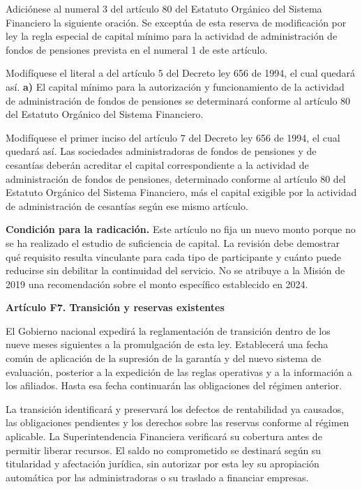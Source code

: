 Adiciónese al numeral 3 del artículo 80 del Estatuto Orgánico del Sistema Financiero la siguiente oración. Se exceptúa de esta reserva de modificación por ley la regla especial de capital mínimo para la actividad de administración de fondos de pensiones prevista en el numeral 1 de este artículo.

Modifíquese el literal a del artículo 5 del Decreto ley 656 de 1994, el cual quedará así. \textbf{a)} El capital mínimo para la autorización y funcionamiento de la actividad de administración de fondos de pensiones se determinará conforme al artículo 80 del Estatuto Orgánico del Sistema Financiero.

Modifíquese el primer inciso del artículo 7 del Decreto ley 656 de 1994, el cual quedará así. Las sociedades administradoras de fondos de pensiones y de cesantías deberán acreditar el capital correspondiente a la actividad de administración de fondos de pensiones, determinado conforme al artículo 80 del Estatuto Orgánico del Sistema Financiero, más el capital exigible por la actividad de administración de cesantías según ese mismo artículo.

\textbf{Condición para la radicación.} Este artículo no fija un nuevo monto porque no se ha realizado el estudio de suficiencia de capital. La revisión debe demostrar qué requisito resulta vinculante para cada tipo de participante y cuánto puede reducirse sin debilitar la continuidad del servicio. No se atribuye a la Misión de 2019 una recomendación sobre el monto específico establecido en 2024.

\textbf{Artículo F7. Transición y reservas existentes}\par\nobreak

El Gobierno nacional expedirá la reglamentación de transición dentro de los nueve meses siguientes a la promulgación de esta ley. Establecerá una fecha común de aplicación de la supresión de la garantía y del nuevo sistema de evaluación, posterior a la expedición de las reglas operativas y a la información a los afiliados. Hasta esa fecha continuarán las obligaciones del régimen anterior.

La transición identificará y preservará los defectos de rentabilidad ya causados, las obligaciones pendientes y los derechos sobre las reservas conforme al régimen aplicable. La Superintendencia Financiera verificará su cobertura antes de permitir liberar recursos. El saldo no comprometido se destinará según su titularidad y afectación jurídica, sin autorizar por esta ley su apropiación automática por las administradoras o su traslado a financiar empresas.

